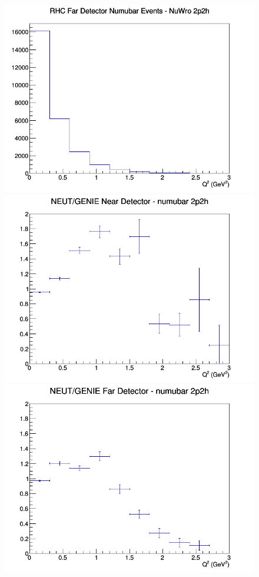 \documentclass[12pt]{article}
\begin{document}
\begin{figure}[h]
\endminipage
{}
\includegraphics[width=\linewidth]{eff_Q2/GAr/2p2h_RHC_FD_numubar_Q2_NuWro.png}
\endminipage
\newline
{}
\includegraphics[width=\linewidth]{eff_Q2/GAr/ratios/2p2h_NEUT_GENIE_numubar_near_Q2.png}
\endminipage
{}
\includegraphics[width=\linewidth]{eff_Q2/GAr/ratios/2p2h_NEUT_GENIE_numubar_far_Q2.png}

\end{figure}
\end{document}
